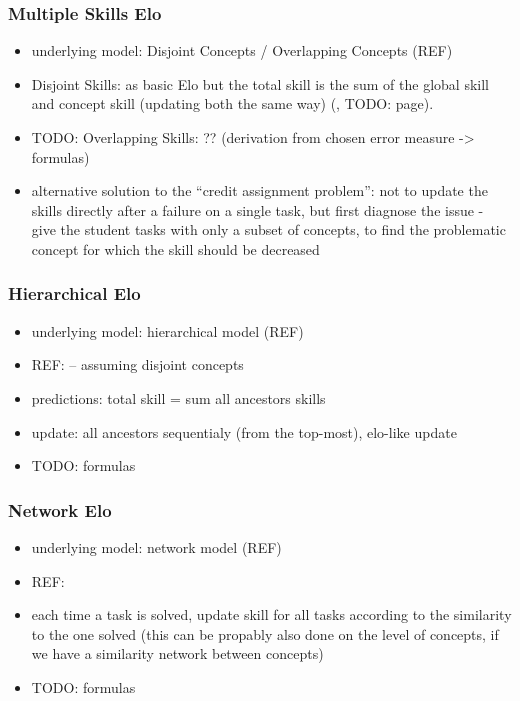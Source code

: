 \subsubsection{Multiple Skills Elo}

\begin{itemize}
\item underlying model: Disjoint Concepts / Overlapping Concepts (REF)
\item Disjoint Skills: as basic Elo but the total skill is the sum of the
global skill and concept skill (updating both the same way) (\cite{rihak-phd}, TODO: page).
\item TODO: Overlapping Skills: ?? (derivation from chosen error measure -> formulas)
\item alternative solution to the ``credit assignment problem'':
  not to update the skills directly after a failure on a single task,
  but first diagnose the issue - give the student tasks with only a subset of concepts,
  to find the problematic concept for which the skill should be decreased
  \cite{assistment-trasfer-models}
\end{itemize}

\subsubsection{Hierarchical Elo}

\begin{itemize}
\item underlying model: hierarchical model (REF)
\item REF: \cite{rihak-phd} -- assuming disjoint concepts
\item predictions: total skill = sum all ancestors skills
\item update: all ancestors sequentialy (from the top-most), elo-like update
\item TODO: formulas
\end{itemize}


\subsubsection{Network Elo}

\begin{itemize}
\item underlying model: network model (REF)
\item REF: \cite{rihak-phd}
\item each time a task is solved, update skill for all tasks according to the
similarity to the one solved (this can be propably also done on the level of
concepts, if we have a similarity network between concepts)
\item TODO: formulas
\end{itemize}



